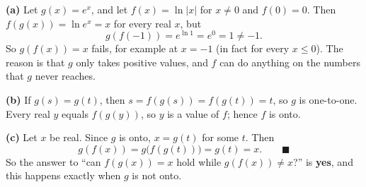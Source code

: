 \textbf{(a)} Let $g(x)=e^x$, and let $f(x)=\ln|x|$ for $x\ne0$ and $f(0)=0$. Then $f(g(x))=\ln e^x=x$ for every real $x$, but
\[
g(f(-1))=e^{\ln1}=e^0=1\ne-1 .
\]
So $g(f(x))=x$ fails, for example at $x=-1$ (in fact for every $x\le0$). The reason is that $g$ only takes positive values, and $f$ can do anything on the numbers that $g$ never reaches.

\textbf{(b)} If $g(s)=g(t)$, then $s=f(g(s))=f(g(t))=t$, so $g$ is one-to-one. Every real $y$ equals $f(g(y))$, so $y$ is a value of $f$; hence $f$ is onto.

\textbf{(c)} Let $x$ be real. Since $g$ is onto, $x=g(t)$ for some $t$. Then
\[
g(f(x))=g\bigl(f(g(t))\bigr)=g(t)=x .\qquad\blacksquare
\]
So the answer to ``can $f(g(x))=x$ hold while $g(f(x))\ne x$?'' is \textbf{yes}, and this happens exactly when $g$ is not onto.
